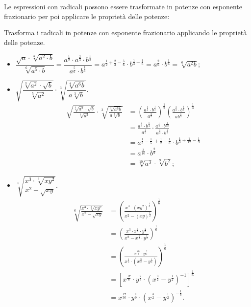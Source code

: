 Le espressioni con radicali possono essere trasformate in potenze con esponente frazionario per poi applicare le proprietà delle potenze:
\begin{exrig}
 \begin{esempio}
Trasforma i radicali in potenze con esponente frazionario applicando le proprietà delle potenze.
\begin{itemize}
 \item $\dfrac{\sqrt a\cdot \sqrt[3]{a^2\cdot b}}{\sqrt[6]{a^5\cdot b}}=\dfrac{a^{\frac 1 2}\cdot a^{\frac 2 3}\cdot b^{\frac 1 3}}{a^{\frac 5 6}\cdot b^{\frac 1 6}}=a^{\frac 1 2+\frac 2 3-\frac 5 6}\cdot b^{\frac 1 3-\frac 1 6}=a^{\frac 2 6}\cdot b^{\frac 1 6}=\sqrt[6]{a^2b}$;
 \item $\sqrt{\dfrac{\sqrt[3]{a^2}\cdot \sqrt b}{\sqrt[5]{a^2}}}\cdot \sqrt[3]{\dfrac{\sqrt[4]{a^6b}}{a\sqrt[3]b}}$.
 \begin{align*}
 \sqrt{\frac{\sqrt[3]{a^2}\cdot \sqrt b}{\sqrt[5]{a^2}}}\cdot \sqrt[3]{\frac{\sqrt[4]{a^6b}}{a\sqrt[3]b}}&=\left(\frac{a^{\frac 2 3}\cdot b^{\frac 1 2}}{a^{\frac 2 5}}\right)^{\frac 1 2}\left(\frac{a^{\frac 3 2}\cdot b^{\frac 1 4}}{ab^{\frac 1 3}}\right)^{\frac 1 3}\\
 &=\frac{a^{\frac 1 3}\cdot b^{\frac 1 4}}{a^{\frac 1 5}}\cdot \frac{a^{\frac 1 2}\cdot b^{\frac 1{12}}}{a^{\frac 1 3}\cdot b^{\frac 1 9}}\\
 &=a^{\frac 1 3-\frac 1 5\;+\frac 1 2-\frac 1 3}\cdot b^{\frac 1 4+\frac 1{12}-\frac 1 9}\\
 &=a^{\frac 3{10}}\cdot b^{\frac 2 9}\\
 &=\sqrt[10]{a^3}\cdot \sqrt[9]{b^2};
 \end{align*}
 \item $\sqrt[6]{\dfrac{x^3\cdot \sqrt[3]{xy^2}}{x^2-\sqrt{xy}}}$.
 \begin{align*}
 \sqrt[6]{\frac{x^3\cdot \sqrt[3]{xy^2}}{x^2-\sqrt{xy}}}&=\left(\frac{x^3\cdot (xy^2)^{\frac 1 3}}{x^2-(xy)^{\frac 1 2}}\right)^{\frac 1 6}\\
 &=\left(\frac{x^3\cdot x^{\frac 1 3}\cdot y^{\frac 2 3}}{x^2-x^{\frac 1 2}\cdot y^{\frac 1 2}}\right)^{\frac 1 6}\\
 &=\left(\frac{x^{\frac{10} 3}\cdot y^{\frac 2 3}}{x^{\frac 1 2}\cdot \left(x^{\frac 3 2}-y^{\frac 1 2}\right)}\right)^{\frac 1 6}\\
 &=\left[x^{\frac{17} 6}\cdot y^{\frac 2 3}\cdot \left(x^{\frac 3 2}-y^{\frac 1 2}\right)^{-1}\right]^{\frac 1 6}\\
 &=x^{\frac{17}{36}}\cdot y^{\frac 1 9}\cdot \left(x^{\frac 3 2}-y^{\frac 1 2}\right)^{-\frac 1 6}.
 \end{align*}
\end{itemize}
 \end{esempio}
\end{exrig}
\vspazio\ovalbox{\risolvii \ref{ese:2.50}, \ref{ese:2.51}, \ref{ese:2.52}, \ref{ese:2.53}, \ref{ese:2.54}, \ref{ese:2.55}, \ref{ese:2.56}, \ref{ese:2.57}, \ref{ese:2.58}, \ref{ese:2.59}, \ref{ese:2.60}, \ref{ese:2.61}, \ref{ese:2.62},}

